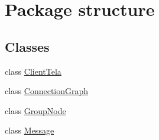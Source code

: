 \hypertarget{namespacestructure}{}\section{Package structure}
\label{namespacestructure}
\subsection*{Classes}
\begin{DoxyCompactItemize}
\item 
class \hyperlink{classstructure_1_1_client_tela}{Client\+Tela}
\item 
class \hyperlink{classstructure_1_1_connection_graph}{Connection\+Graph}
\item 
class \hyperlink{classstructure_1_1_group_node}{Group\+Node}
\item 
class \hyperlink{classstructure_1_1_message}{Message}
\end{DoxyCompactItemize}
